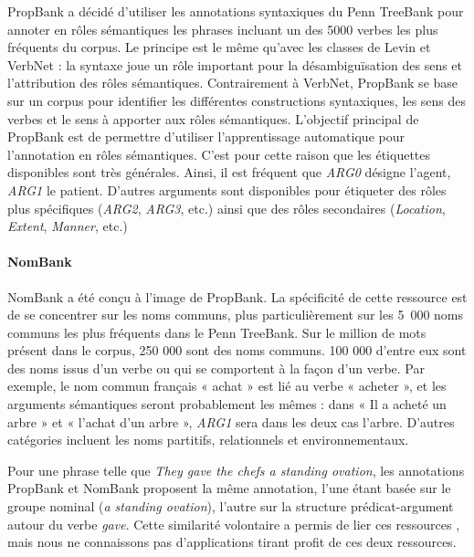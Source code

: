 PropBank \citep{palmer2005proposition} a décidé d'utiliser les annotations
syntaxiques du Penn TreeBank \citep{marcus1993building} pour annoter en rôles
sémantiques les phrases incluant un des 5000 verbes les plus fréquents du
corpus. Le principe est le même qu'avec les classes de Levin et VerbNet : la
syntaxe joue un rôle important pour la désambiguïsation des sens et
l'attribution des rôles sémantiques. Contrairement à VerbNet, PropBank se base
sur un corpus pour identifier les différentes constructions syntaxiques, les
sens des verbes et le sens à apporter aux rôles sémantiques. L'objectif
principal de PropBank est de permettre d'utiliser l'apprentissage automatique
pour l'annotation en rôles sémantiques. C'est pour cette raison que les
étiquettes disponibles sont très générales. Ainsi, il est fréquent que
\textit{ARG0} désigne l'agent, \textit{ARG1} le patient. D'autres arguments
sont disponibles pour étiqueter des rôles plus spécifiques (\textit{ARG2},
\textit{ARG3}, etc.) ainsi que des rôles secondaires (\textit{Location},
\textit{Extent}, \textit{Manner}, etc.)

\paragraph{NomBank}

NomBank \citep{meyers2004nombank} a été conçu à l'image de PropBank. La
spécificité de cette ressource est de se concentrer sur les noms communs, plus
particulièrement sur les 5~000 noms communs les plus fréquents dans le Penn
TreeBank. Sur le million de mots présent dans le corpus, 250 000 sont des noms
communs. 100 000 d'entre eux sont des noms issus d'un verbe ou qui se
comportent à la façon d'un verbe. Par exemple, le nom commun français « achat »
est lié au verbe « acheter », et les arguments sémantiques seront probablement
les mêmes : dans « Il a acheté un arbre » et « l'achat d'un arbre »,
\textit{ARG1} sera dans les deux cas l'arbre. D'autres catégories incluent les
noms partitifs, relationnels et environnementaux.

Pour une phrase telle que \textit{They gave the chefs a standing ovation}, les
annotations PropBank et NomBank proposent la même annotation, l'une étant basée
sur le groupe nominal (\textit{a standing ovation}), l'autre sur la structure
prédicat-argument autour du verbe \textit{gave}. Cette similarité volontaire a
permis de lier ces ressources
\citep{pustejovsky2005merging,verhagen2007combining}, mais nous ne connaissons
pas d'applications tirant profit de ces deux ressources.

